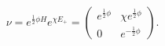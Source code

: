 \begin{equation}
\nu =e^{\frac{1}{2}\phi H}e^{\chi E_{+}}=\left(
\begin{array}{cc}
e^{\frac{1}{2}\phi } & \chi e^{\frac{1}{2}\phi } \\
0 & e^{-\frac{1}{2}\phi }
\end{array}
\right) .
\end{equation}

